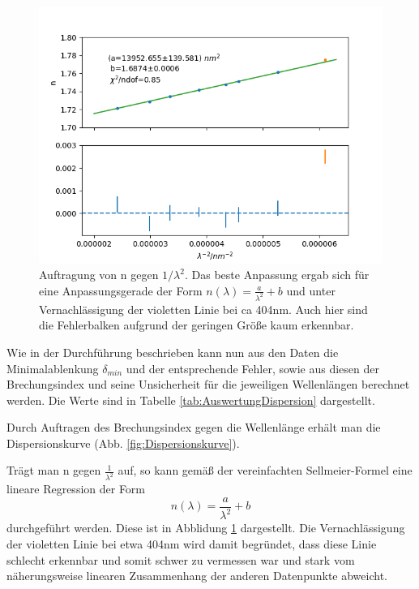 \documentclass[12pt,a4paper]{article}
\begin{document}
	\begin{figure}
		\centering
		\includegraphics[scale=0.88]{Bilder/Regression.png}
		\caption{Auftragung von n gegen $1/\lambda^2$. Das beste Anpassung ergab sich für eine Anpassungsgerade der Form $n(\lambda) = \frac{a}{\lambda^2} + b $ und unter Vernachlässigung der violetten Linie bei ca 404nm. Auch hier sind die Fehlerbalken aufgrund der geringen Größe kaum erkennbar.}
		\label{fig:RegressionDispersion}
	\end{figure}
	
	
	Wie in der Durchführung beschrieben kann nun aus den Daten die Minimalablenkung $\delta_{min}$ und der entsprechende Fehler, sowie aus diesen der Brechungsindex und seine Unsicherheit für die jeweiligen Wellenlängen berechnet werden.
	Die Werte sind in Tabelle \ref{tab:AuswertungDispersion} dargestellt.
	
	Durch Auftragen des Brechungsindex gegen die Wellenlänge erhält man die Dispersionskurve (Abb. \ref{fig:Dispersionskurve}).
	
Trägt man n gegen $\frac{1}{\lambda^2}$ auf, so kann gemäß der vereinfachten Sellmeier-Formel eine lineare Regression der Form
\begin{equation}
n(\lambda) = \dfrac{a}{\lambda^2} + b
\label{eq:linreg_Prisma}
\end{equation} durchgeführt werden. Diese ist in Abblidung
\ref{fig:RegressionDispersion} dargestellt. Die Vernachlässigung der violetten Linie bei etwa 404nm wird damit begründet, dass diese Linie schlecht erkennbar und somit schwer zu vermessen war und stark vom näherungsweise linearen Zusammenhang der anderen Datenpunkte abweicht.
\end{document}
